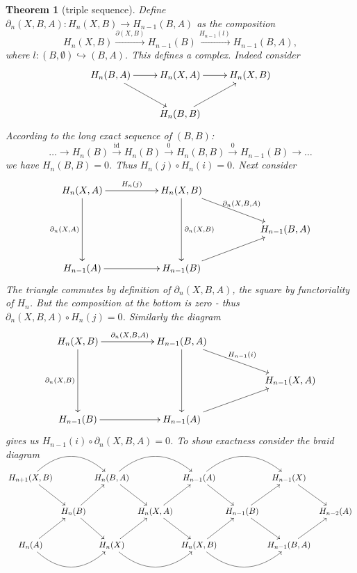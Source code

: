 \documentclass[11pt]{book}
\numberwithin{dummy}{section}
\newtheorem{theorem}{Theorem}[section]
\theoremstyle{nonumberbreak}
\newenvironment{pr}[1][]{\ifthenelse{\equal{#1}{}}{\proof}{\proof[#1]}\rm}{\endproof}
\newcommand{\la}{\longrightarrow}
\newcommand{\id}{\mathrm{id}}
\begin{document}
\begin{spacing}{1.4}
\begin{theorem}[triple sequence]
\begin{pr}
Define $\partial_n(X,B,A): H_n(X,B) \la H_{n-1}(B,A)$ as the composition
$$H_n(X,B) \xrightarrow{\partial(X,B)} H_{n-1}(B) \xrightarrow{H_{n-1}(l)} H_{n-1}(B,A),$$
where $l: (B, \emptyset) \hookrightarrow (B,A)$. This defines a complex. Indeed consider
$$
\begin{xy}
\xymatrix{
H_n(B,A) \ar[r] \ar[rd] & H_n(X,A) \ar[r] & H_n(X,B) \\
& H_n(B,B)\ar[ru] &
}
\end{xy}
$$ 
According to the long exact sequence of $(B,B)$:
$$\ldots \rightarrow H_n(B) \xrightarrow{\id} H_n(B) \xrightarrow{0} H_n(B,B) \xrightarrow{0} H_{n-1}(B) \rightarrow \ldots$$
we have $H_n(B,B) = 0$. Thus $H_n(j) \circ H_n(i)=0$. Next consider
$$
\begin{xy}
\xymatrix{
H_n(X,A) \ar[rr]^{H_n(j)} \ar[dd]_{\partial_n(X,A)} && H_n(X,B) \ar[dd]^{\partial_n(X,B)} \ar[rrd]^{\partial_n(X,B,A)} \\ &&&&H_{n-1}(B,A) \\ H_{n-1}(A) \ar[rr] && H_{n-1}(B) \ar[rru]&& 
}
\end{xy}
$$
The triangle commutes by definition of $\partial_n(X,B,A)$, the square by functoriality of $H_n$. But the composition at the bottom is zero - thus $\partial_n(X,B,A) \circ H_n(j)=0$. Similarly the diagram
$$
\begin{xy}
\xymatrix{
H_n(X,B) \ar[rr]^{\partial_n(X,B,A)} \ar[dd]_{\partial_n(X,B)} && H_{n-1}(B,A) \ar[dd] \ar[rrd]^{H_{n-1}(i)} &&  \\&&&&H_{n-1}(X,A)\\ H_{n-1}(B) \ar[rr] && H_{n-1}(A) \ar[rru] && \\
}
\end{xy}
$$
gives us $H_{n-1}(i) \circ \partial_n(X,B,A)=0$. To show exactness consider the braid diagram

$$
\begin{xy}
\xymatrix@C=0.4em{
H_{n+1}(X,B) \ar@/^{26pt}/[rr] \ar[rd] && H_n(B,A) \ar[rd] \ar@/^{26pt}/[rr] && H_{n-1}(A) \ar[rd] \ar@/^{26pt}/[rr] && H_{n-1}(X) \ar[rd] & \\
& H_n(B) \ar[ru] \ar[rd] && H_n(X,A) \ar[rd] \ar[ru] && H_{n-1}(B) \ar[rd] \ar[ru] && H_{n-2}(A) \\
H_n(A) \ar[ru] \ar@/_{26pt}/[rr] && H_n(X) \ar[ru] \ar@/_{26pt}/[rr] && H_n(X,B) \ar[ru] \ar@/_{26pt}/[rr] && H_{n-1}(B,A) \ar[ru]&
}
\end{xy}
$$
\textrm{} \\


\end{pr}
\end{theorem}
\end{spacing}
\end{document}
